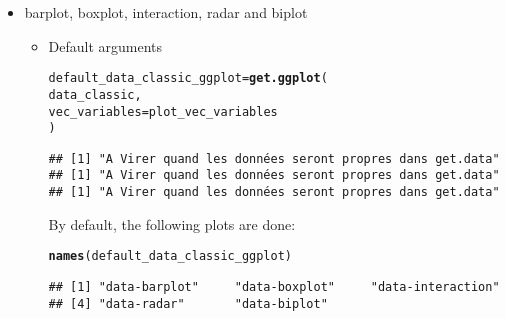 \documentclass{article}\usepackage[]{graphicx}\usepackage[]{color}
\makeatletter
\newcommand{\hlstd}[1]{\textcolor[rgb]{0.345,0.345,0.345}{#1}}%
\newcommand{\hlkwb}[1]{\textcolor[rgb]{0.69,0.353,0.396}{#1}}%
\newcommand{\hlkwc}[1]{\textcolor[rgb]{0.333,0.667,0.333}{#1}}%
\newcommand{\hlkwd}[1]{\textcolor[rgb]{0.737,0.353,0.396}{\textbf{#1}}}%
\newenvironment{kframe}{%
 \def\at@end@of@kframe{}%
 \ifinner\ifhmode%
  \def\at@end@of@kframe{\end{minipage}}%
  \begin{minipage}{\columnwidth}%
 \fi\fi%
 \def\FrameCommand##1{\hskip\@totalleftmargin \hskip-\fboxsep
 \colorbox{shadecolor}{##1}\hskip-\fboxsep
     \hskip-\linewidth \hskip-\@totalleftmargin \hskip\columnwidth}%
 \MakeFramed {\advance\hsize-\width
   \@totalleftmargin\z@ \linewidth\hsize
   \@setminipage}}%
 {\par\unskip\endMakeFramed%
 \at@end@of@kframe}
\newenvironment{knitrout}{}{} %
\makeatother
\begin{document}
\begin{itemize}

\item barplot, boxplot, interaction, radar and biplot

\begin{itemize}

\item Default arguments
\begin{knitrout}
\color{fgcolor}\begin{kframe}
\begin{alltt}
\hlstd{default_data_classic_ggplot} \hlkwb{=} \hlkwd{get.ggplot}\hlstd{(}
        \hlstd{data_classic,}
        \hlkwc{vec_variables} \hlstd{= plot_vec_variables}
        \hlstd{)}
\end{alltt}


{\ttfamily\noindent\itshape\color{messagecolor}{\#\# As ggplot.type is NULL, ggplot.Type is set to data-barplot, data-boxplot, data-interaction, data-radar, data-biplot\\\#\# As x.axis and in.col are NULL, all the combinaisons of x.axis and in.col are done for data-barplot, data-boxplot and data-interaction.\\\#\# As in.col is NULL, each in.col are done for data-radar and data-biplot.}}\begin{verbatim}
## [1] "A Virer quand les données seront propres dans get.data"
## [1] "A Virer quand les données seront propres dans get.data"
## [1] "A Virer quand les données seront propres dans get.data"
\end{verbatim}


{\ttfamily\noindent\itshape{}}\end{kframe}
\end{knitrout}

By default, the following plots are done:
\begin{knitrout}
\color{fgcolor}\begin{kframe}
\begin{alltt}
\hlkwd{names}\hlstd{(default_data_classic_ggplot)}
\end{alltt}
\begin{verbatim}
## [1] "data-barplot"     "data-boxplot"     "data-interaction"
## [4] "data-radar"       "data-biplot"
\end{verbatim}
\end{kframe}
\end{knitrout}


\end{itemize}
\end{itemize}
\end{document}
